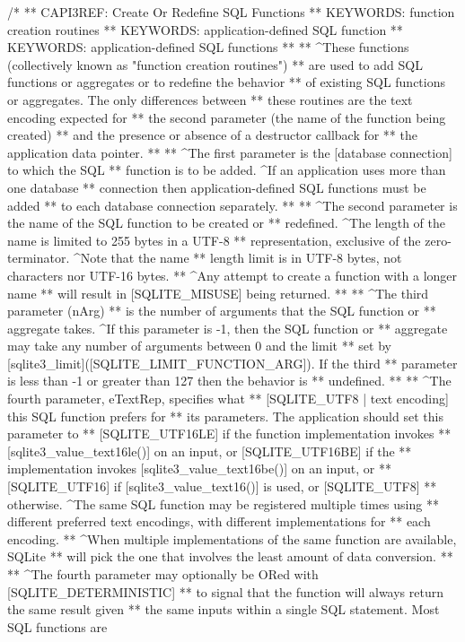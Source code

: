 \begin{Codex}[label=sqlite3.h,numbers=left]
{/*
** CAPI3REF: Create Or Redefine SQL Functions
** KEYWORDS: {function creation routines}
** KEYWORDS: {application-defined SQL function}
** KEYWORDS: {application-defined SQL functions}
**
** ^These functions (collectively known as "function creation routines")
** are used to add SQL functions or aggregates or to redefine the behavior
** of existing SQL functions or aggregates.  The only differences between
** these routines are the text encoding expected for
** the second parameter (the name of the function being created)
** and the presence or absence of a destructor callback for
** the application data pointer.
**
** ^The first parameter is the [database connection] to which the SQL
** function is to be added.  ^If an application uses more than one database
** connection then application-defined SQL functions must be added
** to each database connection separately.
**
** ^The second parameter is the name of the SQL function to be created or
** redefined.  ^The length of the name is limited to 255 bytes in a UTF-8
** representation, exclusive of the zero-terminator.  ^Note that the name
** length limit is in UTF-8 bytes, not characters nor UTF-16 bytes.  
** ^Any attempt to create a function with a longer name
** will result in [SQLITE_MISUSE] being returned.
**
** ^The third parameter (nArg)
** is the number of arguments that the SQL function or
** aggregate takes. ^If this parameter is -1, then the SQL function or
** aggregate may take any number of arguments between 0 and the limit
** set by [sqlite3_limit]([SQLITE_LIMIT_FUNCTION_ARG]).  If the third
** parameter is less than -1 or greater than 127 then the behavior is
** undefined.
**
** ^The fourth parameter, eTextRep, specifies what
** [SQLITE_UTF8 | text encoding] this SQL function prefers for
** its parameters.  The application should set this parameter to
** [SQLITE_UTF16LE] if the function implementation invokes 
** [sqlite3_value_text16le()] on an input, or [SQLITE_UTF16BE] if the
** implementation invokes [sqlite3_value_text16be()] on an input, or
** [SQLITE_UTF16] if [sqlite3_value_text16()] is used, or [SQLITE_UTF8]
** otherwise.  ^The same SQL function may be registered multiple times using
** different preferred text encodings, with different implementations for
** each encoding.
** ^When multiple implementations of the same function are available, SQLite
** will pick the one that involves the least amount of data conversion.
**
** ^The fourth parameter may optionally be ORed with [SQLITE_DETERMINISTIC]
** to signal that the function will always return the same result given
** the same inputs within a single SQL statement.  Most SQL functions are
}
\end{Codex}
